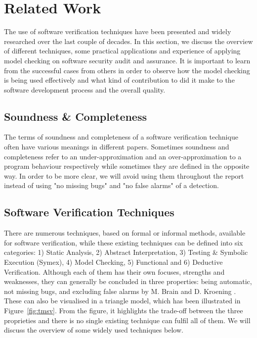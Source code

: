 
\section{Related Work}
The use of software verification techniques have been presented and widely researched over the last couple of decades. In this section, we discuss the overview of different techniques, some practical applications and experience of applying model checking on software security audit and assurance. It is important to learn from the successful cases from others in order to observe how the model checking is being used effectively and what kind of contribution to did it make to the software development process and the overall quality.


\subsection{Soundness \& Completeness}
The terms of soundness and completeness of a software verification technique often have various meanings in different papers. Sometimes soundness and completeness refer to an under-approximation and an over-approximation to a program behaviour respectively while sometimes they are defined in the opposite way. In order to be more clear, we will avoid using them throughout the report instead of using "no missing bugs" and "no false alarms" of a detection.  


\subsection{Software Verification Techniques}
There are numerous techniques, based on formal or informal methods, available for software verification, while these existing techniques can be defined into six categories: 1) Static Analysis, 2) Abstract Interpretation, 3) Testing \& Symbolic Execution (Symex), 4) Model Checking, 5) Functional and 6) Deductive Verification. Although each of them has their own focuses, strengths and weaknesses, they can generally be concluded in three properties: being automatic, not missing bugs, and excluding false alarms by M. Brain and D. Kroening \cite{TSVP}. These can also be visualised in a triangle model, which has been illustrated in Figure~\ref{fig:tmsv}. From the figure, it highlights the trade-off between the three proprieties and there is no single existing technique can fulfil all of them. We will discuss the overview of some widely used techniques below.
  

